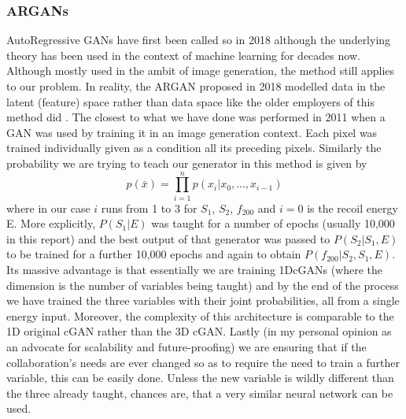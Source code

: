 \documentclass[11pt]{article} %
\begin{document}
\subsubsection{ARGANs}
AutoRegressive GANs \cite{yazici2018autoregressive} \cite{zhao2019compression} have first been called so in 2018 although the underlying theory has been used in the context of machine learning for decades now.
Although mostly used in the ambit of image generation, the method still applies to our problem.
In reality, the ARGAN proposed in 2018 modelled data in the latent (feature) space rather than data space like the older
employers of this method did \cite{fu2019time}.
The closest to what we have done was performed in 2011 \cite{oord2016pixel} when a GAN was used by training it in an image generation context.
Each pixel was trained individually given as a condition all its preceding pixels.
Similarly the probability we are trying to teach our generator in this method is given by
\begin{equation}
  p(\bar x)= \prod_{i=1}^np(x_i|x_0,...,x_{i-1})
  \label{eq:prob_dist}
\end{equation}
where in our case $i$ runs from 1 to 3 for $S_1$, $S_2$, $f_{200}$ and $i=0$ is the recoil energy E.
More explicitly, $P(S_1|E)$ was taught for a number of epochs (usually 10,000 in this report) and the best output of that generator was
passed to $P(S_2|S_1,E)$ to be trained for a further 10,000 epochs and again to obtain $P(f_{200}|S_2,S_1,E)$.
Its massive advantage is that essentially we are training 1DcGANs (where the dimension is the number of variables being taught) and
by the end of the process we have trained the three variables with their joint probabilities, all from a single energy input.
Moreover, the complexity of this architecture is comparable to the 1D original cGAN rather than the 3D cGAN.
Lastly (in my personal opinion as an advocate for scalability and future-proofing) we are ensuring that if the collaboration's needs
are ever changed so as to require the need to train a further variable, this can be easily done.
Unless the new variable is wildly different than the three already taught, chances are, that a very similar neural network can be used.
\end{document}
